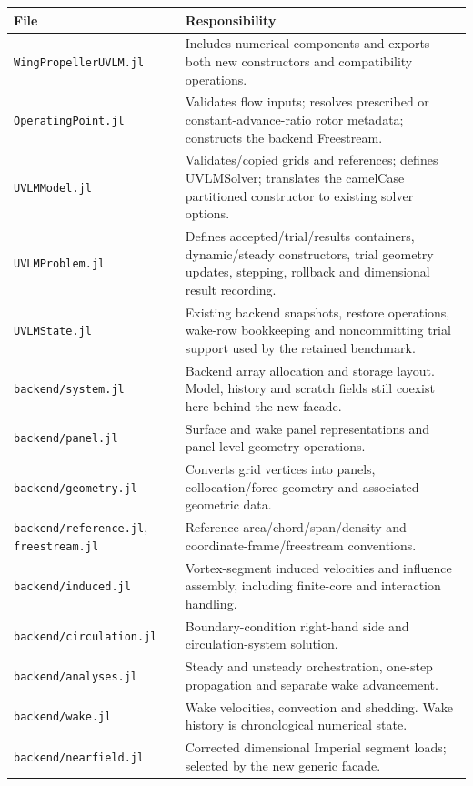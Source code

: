 \documentclass[11pt,a4paper]{article}
\newcommand{\code}{\nolinkurl}
\begin{document}
\begin{longtable}{@{}L{.36\linewidth}L{.56\linewidth}@{}}
\toprule File & Responsibility\\\midrule\endhead
\code{WingPropellerUVLM.jl} & Includes numerical components and exports both new constructors and compatibility operations.\\
\code{OperatingPoint.jl} & Validates flow inputs; resolves prescribed or constant-advance-ratio rotor metadata; constructs the backend Freestream.\\
\code{UVLMModel.jl} & Validates/copied grids and references; defines UVLMSolver; translates the camelCase partitioned constructor to existing solver options.\\
\code{UVLMProblem.jl} & Defines accepted/trial/results containers, dynamic/steady constructors, trial geometry updates, stepping, rollback and dimensional result recording.\\
\code{UVLMState.jl} & Existing backend snapshots, restore operations, wake-row bookkeeping and noncommitting trial support used by the retained benchmark.\\
\code{backend/system.jl} & Backend array allocation and storage layout. Model, history and scratch fields still coexist here behind the new facade.\\
\code{backend/panel.jl} & Surface and wake panel representations and panel-level geometry operations.\\
\code{backend/geometry.jl} & Converts grid vertices into panels, collocation/force geometry and associated geometric data.\\
\code{backend/reference.jl}, \code{freestream.jl} & Reference area/chord/span/density and coordinate-frame/freestream conventions.\\
\code{backend/induced.jl} & Vortex-segment induced velocities and influence assembly, including finite-core and interaction handling.\\
\code{backend/circulation.jl} & Boundary-condition right-hand side and circulation-system solution.\\
\code{backend/analyses.jl} & Steady and unsteady orchestration, one-step propagation and separate wake advancement.\\
\code{backend/wake.jl} & Wake velocities, convection and shedding. Wake history is chronological numerical state.\\
\code{backend/nearfield.jl} & Corrected dimensional Imperial segment loads; selected by the new generic facade.\\

\end{longtable}
\end{document}
